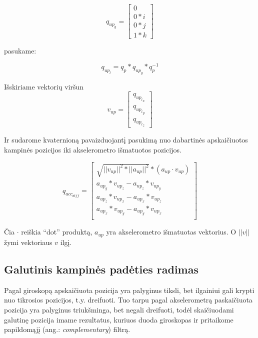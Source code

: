 \documentclass[12pt, a4paper, lithuanian, final]{article}
\begin{document}
\begin{equation}
	q_{up_g} = \left[
		\begin{array}{c}
			0 \\
			0 * i \\
			0 * j \\
			1 * k
		\end{array}
	\right]
\end{equation}

pasukame:

\begin{equation}
	q_{up_l} = q_{p} * q_{up_g} * q_{p}^{-1}
\end{equation}

Išskiriame vektorių viršun
\begin{equation}
	v_{up} = \left[
		\begin{array}{c}
			q_{{up_l}_x} \\
			q_{{up_l}_y} \\
			q_{{up_l}_z}
		\end{array}
	\right]
\end{equation}

Ir sudarome kvaternioną pavaizduojantį pasukimą nuo dabartinės apskaičiuotos kampinės pozicijos iki akselerometro išmatuotos pozicijos.

\begin{equation}
	q_{acc_{diff}} = \left[
		\begin{array}{c}
			\sqrt{ ||v_{up}||^2 * ||a_{up}||^2 } * (a_{up} \cdot v_{up}) \\
			a_{up_y} * v_{up_z} - a_{up_z} * v_{up_y}  \\
			a_{up_z} * v_{up_x} - a_{up_x} * v_{up_z}  \\
			a_{up_x} * v_{up_y} - a_{up_y} * v_{up_x}  \\
		\end{array}
	\right]
\end{equation}

Čia $\cdot$ reiškia "`dot"' produktą, $a_{up}$ yra akselerometro išmatuotas vektorius. O $||v||$ žymi vektoriaus $v$ ilgį.


\subsection{Galutinis kampinės padėties radimas}
\label{subskyr-final-quaternion}

Pagal giroskopą apskaičiuota pozicija yra palyginus tiksli, bet ilgainiui gali krypti nuo tikrosios pozicijos, t.y. dreifuoti.
Tuo tarpu pagal akselerometrą paskaičiuota pozicija yra palyginus triukšminga, bet negali dreifuoti, todėl skaičiuodami galutinę pozicija imame rezultatus, kuriuos duoda giroskopas ir pritaikome papildomąjį (ang.: \textit{complementary}) filtrą.
\end{document}
